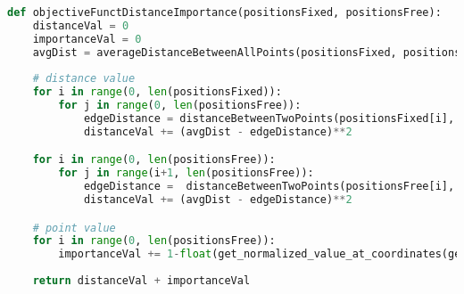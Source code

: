 \begin{lstlisting}[language=Python, style=jupycolors]
def objectiveFunctDistanceImportance(positionsFixed, positionsFree):
    distanceVal = 0
    importanceVal = 0
    avgDist = averageDistanceBetweenAllPoints(positionsFixed, positionsFree)
    
    # distance value
    for i in range(0, len(positionsFixed)):
        for j in range(0, len(positionsFree)):
            edgeDistance = distanceBetweenTwoPoints(positionsFixed[i], positionsFree[j])
            distanceVal += (avgDist - edgeDistance)**2

    for i in range(0, len(positionsFree)):
        for j in range(i+1, len(positionsFree)):
            edgeDistance =  distanceBetweenTwoPoints(positionsFree[i], positionsFree[j])
            distanceVal += (avgDist - edgeDistance)**2

    # point value
    for i in range(0, len(positionsFree)):
        importanceVal += 1-float(get_normalized_value_at_coordinates(geo_data_merged, positionsFree[i, 0], positionsFree[i, 1]))
    
    return distanceVal + importanceVal
\end{lstlisting}